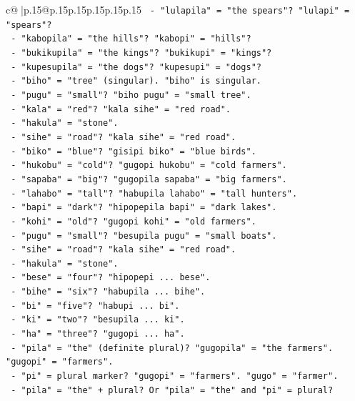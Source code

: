 \documentclass{article}
\begin{document}
{\begin{supertabular}{c@{$\;$}|p{.15\linewidth}@{}p{.15\linewidth}p{.15\linewidth}p{.15\linewidth}p{.15\linewidth}p{.15\linewidth}}
{{{\texttt{  {-} "lulapila" = "the spears"? "lulapi" = "spears"?} \\
\texttt{  {-} "kabopila" = "the hills"? "kabopi" = "hills"?} \\
\texttt{  {-} "bukikupila" = "the kings"? "bukikupi" = "kings"?} \\
\texttt{  {-} "kupesupila" = "the dogs"? "kupesupi" = "dogs"?} \\
\texttt{  {-} "biho" = "tree" (singular). "biho" is singular.} \\
\texttt{  {-} "pugu" = "small"? "biho pugu" = "small tree".} \\
\texttt{  {-} "kala" = "red"? "kala sihe" = "red road".} \\
\texttt{  {-} "hakula" = "stone".} \\
\texttt{  {-} "sihe" = "road"? "kala sihe" = "red road".} \\
\texttt{  {-} "biko" = "blue"? "gisipi biko" = "blue birds".} \\
\texttt{  {-} "hukobu" = "cold"? "gugopi hukobu" = "cold farmers".} \\
\texttt{  {-} "sapaba" = "big"? "gugopila sapaba" = "big farmers".} \\
\texttt{  {-} "lahabo" = "tall"? "habupila lahabo" = "tall hunters".} \\
\texttt{  {-} "bapi" = "dark"? "hipopepila bapi" = "dark lakes".} \\
\texttt{  {-} "kohi" = "old"? "gugopi kohi" = "old farmers".} \\
\texttt{  {-} "pugu" = "small"? "besupila pugu" = "small boats".} \\
\texttt{  {-} "sihe" = "road"? "kala sihe" = "red road".} \\
\texttt{  {-} "hakula" = "stone".} \\
\texttt{  {-} "bese" = "four"? "hipopepi ... bese".} \\
\texttt{  {-} "bihe" = "six"? "habupila ... bihe".} \\
\texttt{  {-} "bi" = "five"? "habupi ... bi".} \\
\texttt{  {-} "ki" = "two"? "besupila ... ki".} \\
\texttt{  {-} "ha" = "three"? "gugopi ... ha".} \\
\texttt{  {-} "pila" = "the" (definite plural)? "gugopila" = "the farmers". "gugopi" = "farmers".} \\
\texttt{  {-} "pi" = plural marker? "gugopi" = "farmers". "gugo" = "farmer".} \\
\texttt{  {-} "pila" = "the" + plural? Or "pila" = "the" and "pi" = plural?} \\
}}}
\end{supertabular}}
\end{document}
